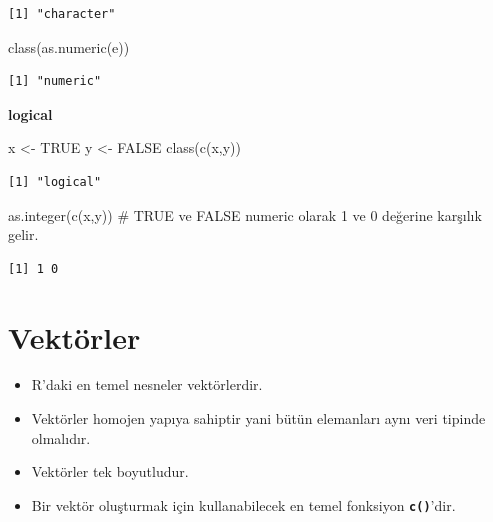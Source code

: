 \documentclass[
  letterpaper,
  DIV=11,
  numbers=noendperiod]{scrreprt}
\newenvironment{Shaded}{\begin{snugshade}}{\end{snugshade}}
\newcommand{\CommentTok}[1]{\textcolor[rgb]{0.37,0.37,0.37}{#1}}
\newcommand{\ConstantTok}[1]{\textcolor[rgb]{0.56,0.35,0.01}{#1}}
\newcommand{\FunctionTok}[1]{\textcolor[rgb]{0.28,0.35,0.67}{#1}}
\newcommand{\NormalTok}[1]{\textcolor[rgb]{0.00,0.23,0.31}{#1}}
\newcommand{\OtherTok}[1]{\textcolor[rgb]{0.00,0.23,0.31}{#1}}
\begin{document}
\begin{verbatim}
[1] "character"
\end{verbatim}

\begin{Shaded}
\begin{Highlighting}[]
\FunctionTok{class}\NormalTok{(}\FunctionTok{as.numeric}\NormalTok{(e))}
\end{Highlighting}
\end{Shaded}

\begin{verbatim}
[1] "numeric"
\end{verbatim}

\textbf{logical}

\begin{Shaded}
\begin{Highlighting}[]
\NormalTok{x }\OtherTok{\textless{}{-}} \ConstantTok{TRUE}
\NormalTok{y }\OtherTok{\textless{}{-}} \ConstantTok{FALSE}
\FunctionTok{class}\NormalTok{(}\FunctionTok{c}\NormalTok{(x,y))}
\end{Highlighting}
\end{Shaded}

\begin{verbatim}
[1] "logical"
\end{verbatim}

\begin{Shaded}
\begin{Highlighting}[]
\FunctionTok{as.integer}\NormalTok{(}\FunctionTok{c}\NormalTok{(x,y)) }\CommentTok{\# TRUE ve FALSE numeric olarak 1 ve 0 değerine karşılık gelir.}
\end{Highlighting}
\end{Shaded}

\begin{verbatim}
[1] 1 0
\end{verbatim}

\hypertarget{vektuxf6rler}{%
\section{Vektörler}\label{vektuxf6rler}}

\begin{itemize}
\item
  R'daki en temel nesneler vektörlerdir.
\item
  Vektörler homojen yapıya sahiptir yani bütün elemanları aynı veri
  tipinde olmalıdır.
\item
  Vektörler tek boyutludur.
\item
  Bir vektör oluşturmak için kullanabilecek en temel fonksiyon
  \textbf{\texttt{c()}}'dir.
\end{itemize}
\end{document}
